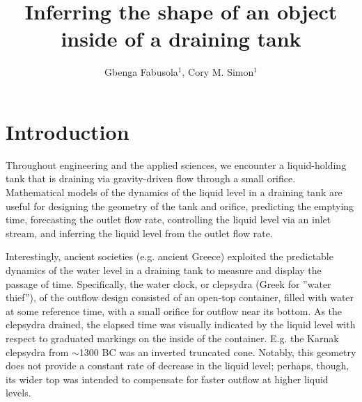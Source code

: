 \documentclass[openacc]{rsproca_new}%
\begin{document}
\title{Inferring the shape of an object inside of a draining tank}

\author{%
Gbenga Fabusola$^{1}$, 
Cory M. Simon$^{1}$
}

\address{$^{1}$School of Chemical, Biological, and Environmental Engineering. Oregon State University. Corvallis, OR, USA.
}

\subject{applied mathematics, chemical engineering}



\begin{abstract}

\absbreak %
\end{abstract}

\rsbreak


\section{Introduction}
Throughout engineering and the applied sciences, we encounter a liquid-holding tank that is draining via gravity-driven flow through a small orifice.
Mathematical models of the dynamics of the liquid level in a draining tank are useful for designing the geometry of the tank and orifice, predicting the emptying time, forecasting the outlet flow rate, controlling the liquid level via an inlet stream, and inferring the liquid level from the outlet flow rate.

Interestingly, ancient societies (e.g. ancient Greece) exploited the predictable dynamics of the water level in a draining tank to measure and display the passage of time.
Specifically, the water clock, or clepsydra (Greek for ''water thief''), of the outflow design consisted of an open-top container, filled with water at some reference time, with a small orifice for outflow near its bottom.
As the clepsydra drained, the elapsed time was visually indicated by the liquid level with respect to graduated markings on the inside of the container. \cite{bedini1962compartmented,hwang2021historical,ritner2016oriental,hejun1987research,schomberg2018karnak,mills1982newton}
E.g. the Karnak clepsydra from $\sim$1300 BC \cite{schomberg2018karnak} was an inverted truncated cone. Notably, this geometry does not provide a constant rate of decrease in the liquid level; perhaps, though, its wider top was intended to compensate for faster outflow at higher liquid levels.
\end{document}

